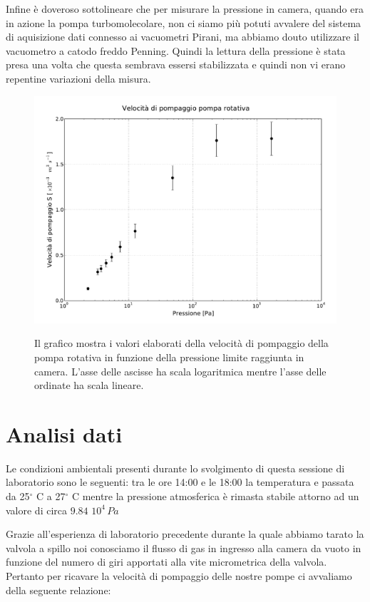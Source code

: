 Infine è doveroso sottolineare che per misurare la pressione in camera, quando era in azione la pompa turbomolecolare,
non ci siamo più potuti avvalere del sistema di aquisizione dati connesso ai vacuometri Pirani, ma abbiamo douto utilizzare
il vacuometro a catodo freddo Penning. Quindi la lettura della pressione è stata presa una volta che questa sembrava
essersi stabilizzata e quindi non vi erano repentine variazioni della misura.  

\begin{figure}[b!]
	\centering
		\includegraphics[width = 15cm]{rotativa.pdf}
		\label{fig:rotativa}
	\caption{Il grafico mostra i valori elaborati della velocità di pompaggio della pompa rotativa in funzione della pressione limite raggiunta in camera. L'asse delle ascisse ha scala logaritmica mentre l'asse delle ordinate ha scala lineare.}
\end{figure}

\section{Analisi dati}

Le condizioni ambientali presenti durante lo svolgimento di questa sessione di laboratorio sono le seguenti: tra le ore 14:00 e le 18:00 la temperatura e passata da 25$^\circ$ C a 27$^\circ$ C mentre la pressione atmosferica è rimasta stabile attorno ad un valore di circa $9.84\,\,10^4\, Pa$

Grazie all'esperienza di laboratorio precedente durante la quale abbiamo tarato la valvola a spillo noi conosciamo il flusso di gas in ingresso alla camera da vuoto in funzione del numero di giri apportati alla vite micrometrica della valvola.
Pertanto per ricavare la velocità di pompaggio delle nostre pompe ci avvaliamo della seguente relazione:


